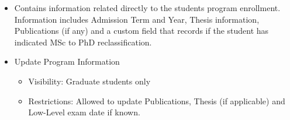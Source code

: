\documentclass{journal}
\begin{document}
\begin{itemize}

\item Contains information related directly to the students program enrollment. Information includes Admission Term and Year, Thesis information, Publications (if any) and a custom field that records if the student has indicated MSc to PhD reclassification.
\item Update Program Information
\begin{itemize}
\item Visibility: Graduate students only
\item Restrictions: Allowed to update Publications, Thesis (if applicable) and Low-Level exam date if known. 
\end {itemize} 
\end {itemize} 
\end{document}
